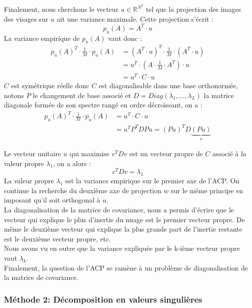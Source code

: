\documentclass[12pt,french]{article}
\theoremstyle{plain}
\theoremstyle{definition}
\begin{document}
Finalement, nous cherchons le vecteur $u \in \mathbb{R}^{N^2}$ tel que la projection des images des visages sur $u$ ait une variance maximale. Cette projection s'écrit :
\[
  p_u(A)=A^T \cdot u
\]
La variance empirique de $p_u(A)$ vaut donc :
\begin{align*}
  p_u(A)^T \cdot \frac{1}{M} \cdot p_u(A) &= (A^T \cdot u)^T \cdot \frac{1}{M} \cdot (A^T \cdot u)\\
                                          &= u^T \cdot \left( A \cdot \frac{1}{M} \cdot A^T \right) \cdot u\\
                                          &= u^T \cdot C \cdot u
\end{align*}
$C$ est symétrique réelle donc $C$ est diagonalisable dans une base orthonormée,
notons $P$ le changement de base associé et $D = Diag(\lambda_1, \dotsc, \lambda_L)$ la matrice diagonale formée de son spectre rangé en ordre décroissant, on a :
\begin{align*}
  p_u(A)^T \cdot \frac{1}{M} \cdot p_u(A) &= u^T \cdot C \cdot u\\
                                          &= u^T P^T D P u = (Pu)^T D \underbrace{(Pu)}_v
\end{align*}

Le vecteur unitaire $u$ qui maximise $v^T D v$  est un vecteur propre de $C$ associé à la valeur propre $\lambda_1$, on a alors :
\[
  v^T D v = \lambda_1
\]
La valeur propre $\lambda_1$ est la variance empirique sur le premier axe de l'ACP.
On continue la recherche du deuxième axe de projection $w$ sur le même principe en imposant qu'il soit orthogonal à $u$.\\

La diagonalisation de la matrice de covariance, nous a permis d'écrire que le vecteur qui explique le plus d'inertie du nuage est le premier vecteur propre.
De même le deuxième vecteur qui explique la plus grande part de l'inertie restante est le deuxième vecteur propre, etc.\\
Nous avons vu en outre que la variance expliquée par le k-ième vecteur propre vaut $\lambda_k$.\\
Finalement, la question de l'ACP se ramène à un problème de diagonalisation de la matrice de covariance.

\subsubsection{Méthode 2: Décomposition en valeurs singulières}
\end{document}
